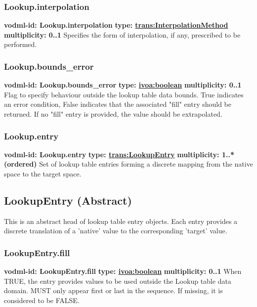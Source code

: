     \subsubsection{Lookup.interpolation}
      \textbf{vodml-id: Lookup.interpolation} \newline
      \textbf{type: \hyperref[sect:InterpolationMethod]{trans:InterpolationMethod}} \newline
      \textbf{multiplicity: 0..1} \newline 
      Specifies the form of interpolation, if any, prescribed to be performed.

    \subsubsection{Lookup.bounds\_error}
      \textbf{vodml-id: Lookup.bounds\_error} \newline
      \textbf{type: \hyperref[sect:ivoa]{ivoa:boolean}} \newline
      \textbf{multiplicity: 0..1} \newline 
      Flag to specify behaviour outside the lookup table data bounds. True indicates an error condition, False indicates that the associated "fill" entry should be returned. If no "fill" entry is provided, the value should be extrapolated.

    \subsubsection{Lookup.entry}
      \textbf{vodml-id: Lookup.entry} \newline
      \textbf{type: \hyperref[sect:LookupEntry]{trans:LookupEntry}} \newline
      \textbf{multiplicity: 1..*  (ordered)} \newline 
      Set of lookup table entries forming a discrete mapping from the native space to the target space.

  \subsection{LookupEntry (Abstract)}
  \label{sect:LookupEntry}
    This is an abstract head of lookup table entry objects. Each entry provides a discrete translation of a 'native' value to the corresponding 'target' value.

    \subsubsection{LookupEntry.fill}
      \textbf{vodml-id: LookupEntry.fill} \newline
      \textbf{type: \hyperref[sect:ivoa]{ivoa:boolean}} \newline
      \textbf{multiplicity: 0..1} \newline 
      When TRUE, the entry provides values to be used outside the Lookup table data domain. MUST only appear first or last in the sequence. If missing, it is considered to be FALSE.

